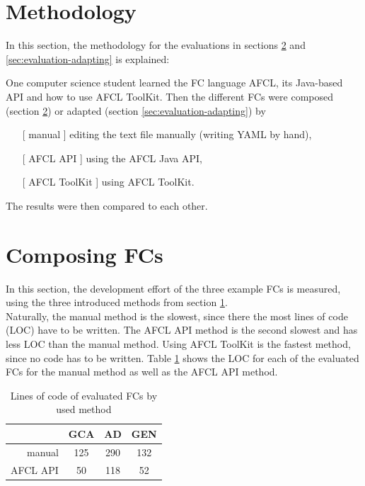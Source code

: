 \documentclass[a4paper,top=25mm,bottom=25mm,12pt,pdftex,halfparskip,twoside,openany,bibtotoc,numbers=noenddot]{scrbook}
\begin{document}
\section{Methodology}
\label{sec:evaluation-methodology}

In this section, the methodology for the evaluations in sections \ref{sec:evaluation-composing} and \ref{sec:evaluation-adapting} is explained:

One computer science student learned the FC language AFCL, its Java-based API and how to use AFCL ToolKit.
Then the different FCs were composed (section \ref{sec:evaluation-composing}) or adapted (section \ref{sec:evaluation-adapting}) by
\begin{itemize}[leftmargin=4cm, labelsep=0.8cm]
	\item [{[ \textsf{manual} ]}] editing the text file manually (writing YAML by hand),
	\item [{[ \textsf{AFCL API} ]}] using the AFCL Java API,
	\item [{[ \textsf{AFCL ToolKit} ]}] using AFCL ToolKit.
\end{itemize}

The results were then compared to each other.

\section{Composing FCs}
\label{sec:evaluation-composing}

In this section, the development effort of the three example FCs is measured, using the three introduced methods from section \ref{sec:evaluation-methodology}.\\
Naturally, the manual method is the slowest, since there the most lines of code (LOC) have to be written.
The AFCL API method is the second slowest and has less LOC than the manual method.
Using AFCL ToolKit is the fastest method, since no code has to be written.
Table \ref{tbl:evaluation-fc-loc} shows the LOC for each of the evaluated FCs for the manual method as well as the AFCL API method.

\begin{table}[ht]
\caption{Lines of code of evaluated FCs by used method}
\centering
\def\arraystretch{1.2}
\begin{tabular}{rccc}
\hline\hline
        & GCA & AD  & GEN \\ \hline\
manual   & 125 & 290 & 132 \\ 
AFCL API & 50  & 118 & 52  \\ \hline
\end{tabular}
\label{tbl:evaluation-fc-loc}
\end{table}
\end{document}
